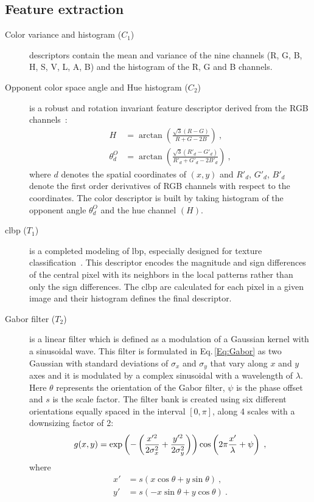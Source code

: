 \subsection{Feature extraction}\label{sec:feat}

\begin{description}
\item[Color variance and histogram ($C_{1}$)] descriptors contain the mean and variance of the nine channels (R, G, B, H, S, V, L, A, B) and the histogram of the R, G and B channels.
\item[Opponent color space angle and Hue histogram ($C_{2}$)] is a robust and rotation invariant feature descriptor derived from the RGB channels~\cite{van2006coloring}:
  \begin{align}\label{Eq:AngO}
    H &= \arctan\left(\frac{\sqrt{3}\left(R-G\right)}{R+G-2B}\right) \ , \nonumber \\
    \theta^{O}_{d} &= \arctan \left( \frac{\sqrt{3}\left(R'_{d}-G'_{d}\right)}{R'_{d}+G'_{d}-2B'_{d}}\right) \ ,
  \end{align}
\noindent where $d$ denotes the spatial coordinates of $(x,y)$ and $R'_{d}$, $G'_{d}$, $B'_{d}$ denote the first order derivatives of RGB channels with respect to the coordinates. 
The color descriptor is built by taking histogram of the opponent angle $\theta^{O}_{d}$ and the hue channel $(H)$.
\item[\ac{clbp} ($T_{1}$)] is a completed modeling of \Ac{lbp}, especially designed for texture classification~\cite{guo2010completed}. 
This descriptor encodes the magnitude and sign differences of the central pixel with its neighbors in the local patterns rather than only the sign differences. 
The \ac{clbp} are calculated for each pixel in a given image and their histogram defines the final descriptor.
\item[Gabor filter ($T_{2}$)] is a linear filter which is defined as a modulation of a Gaussian kernel with a sinusoidal wave. 
This filter is formulated in Eq.\,\eqref{Eq:Gabor} as two Gaussian with standard deviations of $\sigma_{x}$ and $\sigma_{y}$ that vary along $x$ and $y$ axes and it is modulated by a complex sinusoidal with a wavelength of $\lambda$. 
Here $\theta$ represents the orientation of the Gabor filter, $\psi$ is the phase offset and $s$ is the scale factor. 
The filter bank is created using six different orientations equally spaced in the interval $[0, \pi]$, along 4 scales with a downsizing factor of 2:
\begin{equation}\footnotesize
  \label{Eq:Gabor}
  g(x,y) = \exp{ \left(-\left( \frac{x'^{2}}{2\sigma_{x}^{2}}+\frac{y'^{2}}{2\sigma_{y}^{2}} \right) \right)} \cos\left( 2\pi\frac{x'}{\lambda}+\psi \right) \ , 
\end{equation}
\noindent where
\begin{align*}
  x' &= s\left( x\cos\theta+y\sin\theta\right) \ ,  \\
  y' &= s\left( -x\sin\theta +y\cos\theta\right) \ .
\end{align*}

\end{description}

